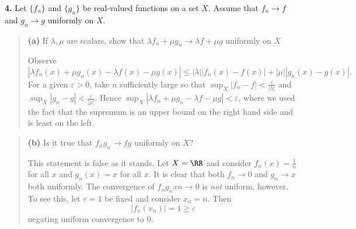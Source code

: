 \documentclass{homework}
\author{Kevin Joyce}
\begin{document}
 
\newcommand{\figref}[1]{\figurename~\ref{#1}}
\renewcommand{\bar}{\overline}
\renewcommand{\hat}{\widehat}
\renewcommand{\SS}{\mathcal S}
\newcommand{\eps}{\varepsilon}
\newcommand{\TTheta}{\overline{\underline \Theta} }
\newcommand{\del}{\partial}
\newcommand{\approxsim}{\overset{\cdotp}{\underset{\cdotp}{\sim}}}
\newcommand{\FF}{\mathcal F}
\renewcommand{\Re}{\mathrm{Re}\,}
\renewcommand{\Im}{\mathrm{Im}\,}
\newcommand{\HH}{\mathcal H}
\nocite{*}

{\bf 4.} Let $\{f_n\}$ and $\{g_n\}$ be real-valued functions on a set $X$. Assume that $f_n\to f$ and $g_n \to g$ uniformly on $X$.  
\begin{quote}
  {\bf (a)} If $\lambda,\mu$ are scalars, show that $\lambda f_n + \mu g_n \to \lambda f + \mu g$ uniformly on $X$
  \begin{solution}
    Observe
    $$
      |\lambda f_n(x) + \mu g_n(x) - \lambda f(x) - \mu g(x)| \le |\lambda| |f_n(x) - f(x)|  + |\mu| |g_n(x) - g(x)|.
    $$
    For a given $\eps >0$, take $n$ sufficiently large so that $\sup_X |f_n - f| < \frac \eps{|\lambda|}$ and $\sup_X |g_n - g|< \frac \eps{|\mu|}$.  Hence $\sup_X|\lambda f_n + \mu g_n - \lambda f - \mu g| < \eps$, where we used the fact that the supremum is an upper bound on the right hand side and is least on the left.
  \end{solution}
\end{quote}
\begin{quote}
  {\bf (b)} Is it true that $f_n g_n \to fg$ uniformly on $X$?
  \begin{solution}
    This statement is false as it stands. Let $X=\RR$ and consider $f_n(x) =
    \frac 1n$ for all $x$ and $g_n(x) = x$ for all $x$.  It is clear that both
    $f_n \to 0$ and $g_n \to x$ both uniformly.  The convergence of $f_n g_n xn
    \to 0$ is \emph{not} uniform, however.  To see this, let $\eps = 1$ be
    fixed and consider $x_n = n$.  Then 
    $$
      |f_n(x_n)| = 1 \ge \eps
    $$
    negating uniform convergence to 0.
  \end{solution}
\end{quote}
\end{document}
